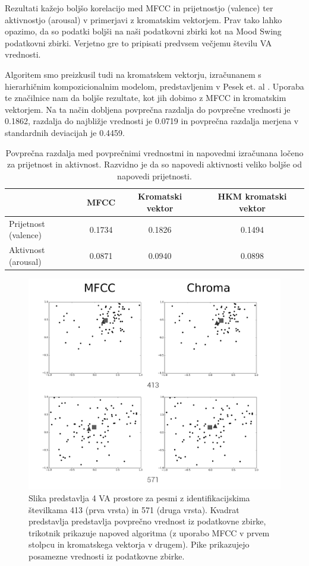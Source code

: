 \documentclass[a4paper, 12pt]{book}
\begin{document}
{Rezultati kažejo boljšo korelacijo med MFCC in prijetnostjo (valence) ter aktivnostjo (arousal) v primerjavi z kromatskim vektorjem. Prav tako lahko opazimo, da so podatki boljši na naši podatkovni zbirki kot na Mood Swing podatkovni zbirki. Verjetno gre to pripisati predvsem večjemu številu VA vrednosti.

Algoritem smo preizkusil tudi na kromatskem vektorju, izračunanem s hierarhičnim kompozicionalnim modelom, predstavljenim v Pesek et. al \cite{Pesek2013}. Uporaba te značilnice nam da boljše rezultate, kot jih dobimo z MFCC in kromatskim vektorjem. Na ta način dobljena povprečna razdalja do povprečne vrednosti je 0.1862, razdalja do najbližje vrednosti je 0.0719 in povprečna razdalja merjena v standardnih deviacijah je 0.4459. 

\begin{table}[htb]
\begin{center}
\caption{Povprečna razdalja med povprečnimi vrednostmi in napovedmi izračunana ločeno za prijetnost in aktivnost. Razvidno je da so napovedi aktivnosti veliko boljše od napovedi prijetnosti. }
\begin{tabular}{|l|c|c|c|}
\hline
 & MFCC & Kromatski vektor & HKM kromatski vektor \\
\hline
Prijetnost (valence) & 0.1734 & 0.1826 & 0.1494\\
Aktivnost (arousal) & 0.0871 & 0.0940 & 0.0898\\
\hline
\end{tabular}
\label{seperateresults}
\end{center}
\end{table}

\begin{figure}[h!bt]
\centering
\includegraphics[width=130mm]{images/graphs1.png}
\caption{Slika predstavlja 4 VA prostore za pesmi z identifikacijskima številkama 413 (prva vrsta) in 571 (druga vrsta). Kvadrat predstavlja predstavlja povprečno vrednost iz podatkovne zbirke, trikotnik prikazuje napoved algoritma (z uporabo MFCC v prvem stolpcu in kromatskega vektorja v drugem). Pike prikazujejo posamezne vrednosti iz podatkovne zbirke.}
\label{graphs}
\end{figure}

}
\end{document}
